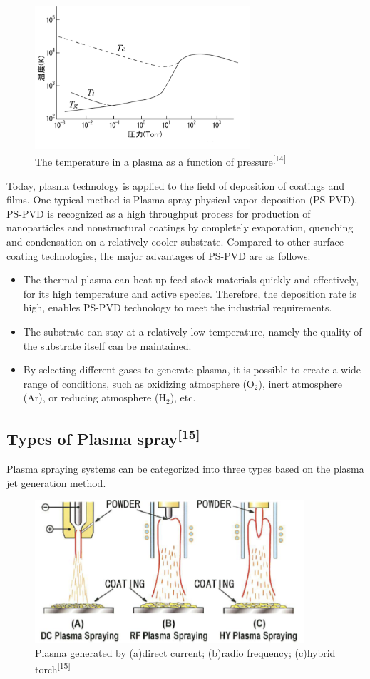 \begin{figure}[h]
\centering
\includegraphics[width=8cm]{src/fig/fig11.png}
\caption{The temperature in a plasma as a function of pressure\textsuperscript{[14]}}
\end{figure}
Today, plasma technology is applied to the field of deposition of coatings and films. One typical method is Plasma spray physical vapor deposition (PS-PVD). PS-PVD is recognized as a high throughput process for production of nanoparticles and nonstructural coatings by completely evaporation, quenching and condensation on a relatively cooler substrate. Compared to other surface coating technologies, the major advantages of PS-PVD are as follows:
\begin{itemize}
  \item The thermal plasma can heat up feed stock materials quickly and effectively, for its high temperature and active species. Therefore, the deposition rate is high, enables PS-PVD technology to meet the industrial requirements.
  \item The substrate can stay at a relatively low temperature, namely the quality of the substrate itself can be maintained.
  \item By selecting different gases to generate plasma, it is possible to create a wide range of conditions, such as oxidizing atmosphere ($\mathrm{O_{2}}$), inert atmosphere (Ar), or reducing atmosphere ($\mathrm{H_{2}}$), etc.
\end{itemize}

\subsection{Types of Plasma spray\textsuperscript{[15]}}
Plasma spraying systems can be categorized into three types based on the plasma jet generation method.
\begin{figure}[H]
\centering
\includegraphics[width=10cm]{src/fig/fig12.png}
\caption{Plasma generated by (a)direct current; (b)radio frequency; (c)hybrid torch\textsuperscript{[15]}}
\end{figure}
